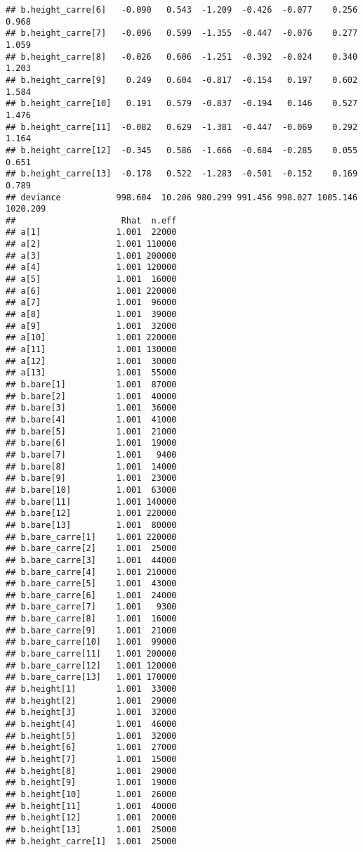 \documentclass[
]{article}
\begin{document}
\begin{verbatim}
## b.height_carre[6]   -0.090   0.543  -1.209  -0.426  -0.077    0.256    0.968
## b.height_carre[7]   -0.096   0.599  -1.355  -0.447  -0.076    0.277    1.059
## b.height_carre[8]   -0.026   0.606  -1.251  -0.392  -0.024    0.340    1.203
## b.height_carre[9]    0.249   0.604  -0.817  -0.154   0.197    0.602    1.584
## b.height_carre[10]   0.191   0.579  -0.837  -0.194   0.146    0.527    1.476
## b.height_carre[11]  -0.082   0.629  -1.381  -0.447  -0.069    0.292    1.164
## b.height_carre[12]  -0.345   0.586  -1.666  -0.684  -0.285    0.055    0.651
## b.height_carre[13]  -0.178   0.522  -1.283  -0.501  -0.152    0.169    0.789
## deviance           998.604  10.206 980.299 991.456 998.027 1005.146 1020.209
##                     Rhat  n.eff
## a[1]               1.001  22000
## a[2]               1.001 110000
## a[3]               1.001 200000
## a[4]               1.001 120000
## a[5]               1.001  16000
## a[6]               1.001 220000
## a[7]               1.001  96000
## a[8]               1.001  39000
## a[9]               1.001  32000
## a[10]              1.001 220000
## a[11]              1.001 130000
## a[12]              1.001  30000
## a[13]              1.001  55000
## b.bare[1]          1.001  87000
## b.bare[2]          1.001  40000
## b.bare[3]          1.001  36000
## b.bare[4]          1.001  41000
## b.bare[5]          1.001  21000
## b.bare[6]          1.001  19000
## b.bare[7]          1.001   9400
## b.bare[8]          1.001  14000
## b.bare[9]          1.001  23000
## b.bare[10]         1.001  63000
## b.bare[11]         1.001 140000
## b.bare[12]         1.001 220000
## b.bare[13]         1.001  80000
## b.bare_carre[1]    1.001 220000
## b.bare_carre[2]    1.001  25000
## b.bare_carre[3]    1.001  44000
## b.bare_carre[4]    1.001 210000
## b.bare_carre[5]    1.001  43000
## b.bare_carre[6]    1.001  24000
## b.bare_carre[7]    1.001   9300
## b.bare_carre[8]    1.001  16000
## b.bare_carre[9]    1.001  21000
## b.bare_carre[10]   1.001  99000
## b.bare_carre[11]   1.001 200000
## b.bare_carre[12]   1.001 120000
## b.bare_carre[13]   1.001 170000
## b.height[1]        1.001  33000
## b.height[2]        1.001  29000
## b.height[3]        1.001  32000
## b.height[4]        1.001  46000
## b.height[5]        1.001  32000
## b.height[6]        1.001  27000
## b.height[7]        1.001  15000
## b.height[8]        1.001  29000
## b.height[9]        1.001  19000
## b.height[10]       1.001  26000
## b.height[11]       1.001  40000
## b.height[12]       1.001  20000
## b.height[13]       1.001  25000
## b.height_carre[1]  1.001  25000

\end{verbatim}
\end{document}

